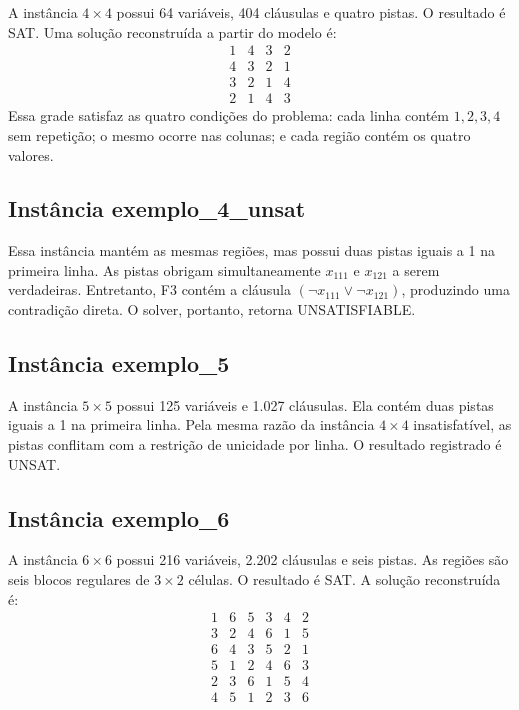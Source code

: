 \documentclass[a4paper, 12pt]{article}
\begin{document}
A instância \(4\times4\) possui 64 variáveis, 404 cláusulas e quatro pistas. O resultado é SAT. Uma solução reconstruída a partir do modelo é:
\[
\begin{array}{cccc}
1 & 4 & 3 & 2 \\
4 & 3 & 2 & 1 \\
3 & 2 & 1 & 4 \\
2 & 1 & 4 & 3
\end{array}
\]
Essa grade satisfaz as quatro condições do problema: cada linha contém \(1,2,3,4\) sem repetição; o mesmo ocorre nas colunas; e cada região contém os quatro valores.

\subsection{Instância exemplo\_4\_unsat}

Essa instância mantém as mesmas regiões, mas possui duas pistas iguais a 1 na primeira linha. As pistas obrigam simultaneamente \(x_{111}\) e \(x_{121}\) a serem verdadeiras. Entretanto, F3 contém a cláusula \((\neg x_{111} \lor \neg x_{121})\), produzindo uma contradição direta. O solver, portanto, retorna UNSATISFIABLE.

\subsection{Instância exemplo\_5}

A instância \(5\times5\) possui 125 variáveis e 1.027 cláusulas. Ela contém duas pistas iguais a 1 na primeira linha. Pela mesma razão da instância \(4\times4\) insatisfatível, as pistas conflitam com a restrição de unicidade por linha. O resultado registrado é UNSAT.

\subsection{Instância exemplo\_6}

A instância \(6\times6\) possui 216 variáveis, 2.202 cláusulas e seis pistas. As regiões são seis blocos regulares de \(3\times2\) células. O resultado é SAT. A solução reconstruída é:
\[
\begin{array}{cccccc}
1 & 6 & 5 & 3 & 4 & 2 \\
3 & 2 & 4 & 6 & 1 & 5 \\
6 & 4 & 3 & 5 & 2 & 1 \\
5 & 1 & 2 & 4 & 6 & 3 \\
2 & 3 & 6 & 1 & 5 & 4 \\
4 & 5 & 1 & 2 & 3 & 6
\end{array}
\]
\end{document}
